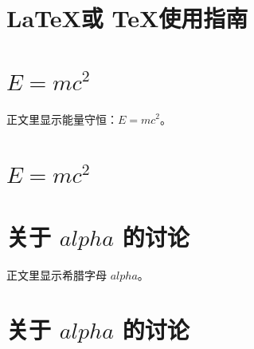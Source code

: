 \documentclass{article}
\def\LaTeX{LaTeX}%
\def\TeX{TeX}%
\def\alpha{alpha}
\begin{document}
\tableofcontents %

\section{\LaTeX 或 \TeX 使用指南}

\section{\texorpdfstring{$E=mc^2$}{E=mc2}}
正文里显示能量守恒：$E=mc^2$。

\section{$E=mc^2$}

\section{\texorpdfstring{关于 $\alpha$ 的讨论}{关于 α 的讨论}}
正文里显示希腊字母 $\alpha$。

\section{关于 $\alpha$ 的讨论}
\end{document}
